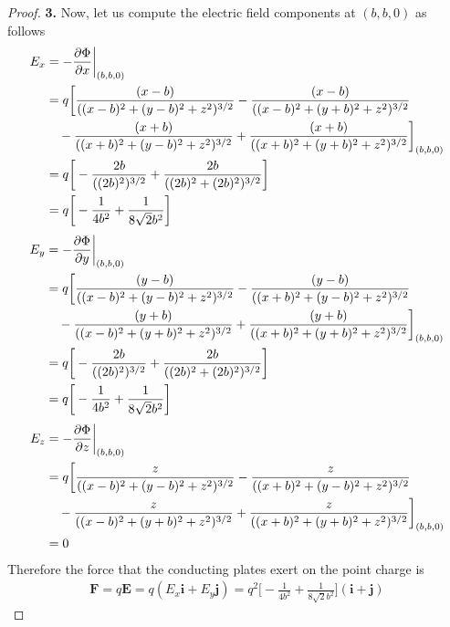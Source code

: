 \documentclass[11pt]{article}
\newcommand{\uvi}{\bm{i}}
\newcommand{\uvj}{\bm{j}}
\theoremstyle{definition}
\begin{document}
\begin{proof}{\textbf{3.}}
    Now, let us compute the electric field components at $(b,b,0)$ as follows
    \begin{align*}
        E_x &= -\pdv{\Phi}{x}\bigg|_{(b,b,0)}\\
        &= q\bigg[\frac{(x-b)}{((x-b)^2 + (y-b)^2 + z^2)^{3/2}}
        - \frac{(x-b)}{((x-b)^2 + (y+b)^2 + z^2)^{3/2}}\\
        &\quad- \frac{(x+b)}{((x+b)^2 + (y-b)^2 + z^2)^{3/2}}
        + \frac{(x+b)}{((x+b)^2 + (y+b)^2 + z^2)^{3/2}}
        \bigg]_{(b,b,0)}\\
        &= q\bigg[- \frac{2b}{((2b)^2)^{3/2}}
        + \frac{2b}{((2b)^2 + (2b)^2)^{3/2}}\bigg]\\
        &= q\bigg[-\frac{1}{4b^2} + \frac{1}{8\sqrt{2}b^2}\bigg]
    \end{align*}
    \begin{align*}
        E_y &= -\pdv{\Phi}{y}\bigg|_{(b,b,0)}\\
        &= q\bigg[\frac{(y-b)}{((x-b)^2 + (y-b)^2 + z^2)^{3/2}}
        - \frac{(y-b)}{((x+b)^2 + (y-b)^2 + z^2)^{3/2}}\\
        &\quad- \frac{(y+b)}{((x-b)^2 + (y+b)^2 + z^2)^{3/2}}
        + \frac{(y+b)}{((x+b)^2 + (y+b)^2 + z^2)^{3/2}}\bigg]_{(b,b,0)}\\
        &= q\bigg[- \frac{2b}{((2b)^2)^{3/2}}
        + \frac{2b}{((2b)^2 + (2b)^2)^{3/2}}\bigg]\\
        &= q\bigg[-\frac{1}{4b^2} + \frac{1}{8\sqrt{2}b^2}\bigg]
    \end{align*}
    \begin{align*}
        E_z &= -\pdv{\Phi}{z}\bigg|_{(b,b,0)}\\
        &= q\bigg[\frac{z}{((x-b)^2 + (y-b)^2 + z^2)^{3/2}}
        - \frac{z}{((x+b)^2 + (y-b)^2 + z^2)^{3/2}}\\
        &\quad- \frac{z}{((x-b)^2 + (y+b)^2 + z^2)^{3/2}}
        + \frac{z}{((x+b)^2 + (y+b)^2 + z^2)^{3/2}}\bigg]_{(b,b,0)}\\
        &= 0
    \end{align*}
    Therefore the force that the conducting plates exert on the point charge
    is
    \begin{align*}
        \bm{F} = q\bm{E}
        = q(E_x\uvi + E_y\uvj)
        = q^2\bigg[-\frac{1}{4b^2} + \frac{1}{8\sqrt{2}b^2}\bigg](\uvi + \uvj)
    \end{align*}
\end{proof}
\end{document}
